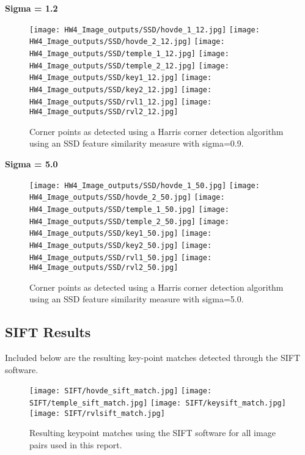 \documentclass{article}
\begin{document}
\newpage
\textbf{Sigma = 1.2}
\begin{figure}[H]
    \centering
    \texttt{[image: HW4\_Image\_outputs/SSD/hovde\_1\_12.jpg]}
    \texttt{[image: HW4\_Image\_outputs/SSD/hovde\_2\_12.jpg]}
    \texttt{[image: HW4\_Image\_outputs/SSD/temple\_1\_12.jpg]}
    \texttt{[image: HW4\_Image\_outputs/SSD/temple\_2\_12.jpg]}
    \texttt{[image: HW4\_Image\_outputs/SSD/key1\_12.jpg]}
    \texttt{[image: HW4\_Image\_outputs/SSD/key2\_12.jpg]}
    \texttt{[image: HW4\_Image\_outputs/SSD/rvl1\_12.jpg]}
    \texttt{[image: HW4\_Image\_outputs/SSD/rvl2\_12.jpg]}
    \caption{Corner points as detected using a Harris corner detection algorithm using an SSD feature similarity measure with sigma=0.9.}
    \label{fig:ncc-points-0.9}
\end{figure}

\newpage
\textbf{Sigma = 5.0}
\begin{figure}[H]
    \centering
    \texttt{[image: HW4\_Image\_outputs/SSD/hovde\_1\_50.jpg]}
    \texttt{[image: HW4\_Image\_outputs/SSD/hovde\_2\_50.jpg]}
    \texttt{[image: HW4\_Image\_outputs/SSD/temple\_1\_50.jpg]}
    \texttt{[image: HW4\_Image\_outputs/SSD/temple\_2\_50.jpg]}
    \texttt{[image: HW4\_Image\_outputs/SSD/key1\_50.jpg]}
    \texttt{[image: HW4\_Image\_outputs/SSD/key2\_50.jpg]}
    \texttt{[image: HW4\_Image\_outputs/SSD/rvl1\_50.jpg]}
    \texttt{[image: HW4\_Image\_outputs/SSD/rvl2\_50.jpg]}
    \caption{Corner points as detected using a Harris corner detection algorithm using an SSD feature similarity measure with sigma=5.0.}
    \label{fig:ncc-points-5.0}
\end{figure}


\subsection{SIFT Results}
Included below are the resulting key-point matches detected through the SIFT software.
\begin{figure}[H]
    \centering
    \texttt{[image: SIFT/hovde\_sift\_match.jpg]}
    \texttt{[image: SIFT/temple\_sift\_match.jpg]}
    \texttt{[image: SIFT/keysift\_match.jpg]}
    \texttt{[image: SIFT/rvlsift\_match.jpg]}
    \caption{Resulting keypoint matches using the SIFT software for all image pairs used in this report.}
    \label{fig:ncc-points-5.0}
\end{figure}
\end{document}
